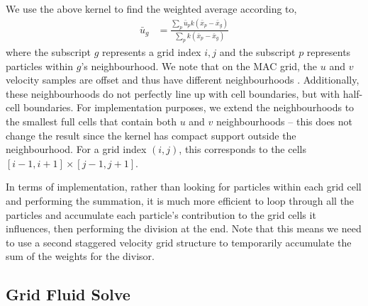 \documentclass[sigconf]{acmart}
\begin{document}
We use the above kernel to find the weighted average according to,
\begin{align}
  \bar{u}_g &= \frac{\sum_{p}\bar{u}_pk(\bar{x}_p-\bar{x}_g)}{\sum_{p}k(\bar{x}_p-\bar{x}_g)} \label{eq:weightedAverage}
\end{align}
where the subscript $g$ represents a grid index $i,j$ and the subscript $p$ represents particles within $g$'s neighbourhood. We note that on the MAC grid, the $u$ and $v$ velocity samples are offset and thus have different neighbourhoods \cite{zhu2005}. Additionally, these neighbourhoods do not perfectly line up with cell boundaries, but with half-cell boundaries. For implementation purposes, we extend the neighbourhoods to the smallest full cells that contain both $u$ and $v$ neighbourhoods -- this does not change the result since the kernel has compact support outside the neighbourhood. For a grid index $(i,j)$, this corresponds to the cells $[i-1,i+1]\times[j-1,j+1]$.

In terms of implementation, rather than looking for particles within each grid cell and performing the summation, it is much more efficient to loop through all the particles and accumulate each particle's contribution to the grid cells it influences, then performing the division at the end. Note that this means we need to use a second staggered velocity grid structure to temporarily accumulate the sum of the weights for the divisor.

\subsection{Grid Fluid Solve} \label{sec:PressureProjection}
\end{document}
